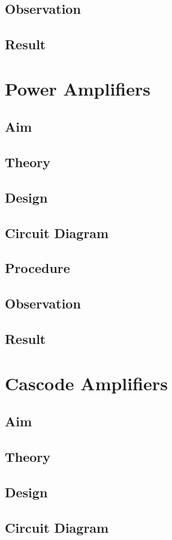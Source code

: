 \documentclass{book}
\begin{document}
\section*{Observation}
\section*{Result}
\chapter[Power Amplifiers]{Power Amplifiers}
\section*{Aim}
\section*{Theory}
\section*{Design}
\section*{Circuit Diagram}
\section*{Procedure}
\section*{Observation}
\section*{Result}
\chapter[Cascode Amplifiers]{Cascode Amplifiers}
\section*{Aim}
\section*{Theory}
\section*{Design}
\section*{Circuit Diagram}
\end{document}
